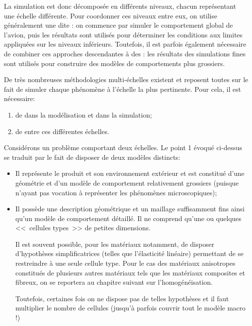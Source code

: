 La simulation est donc décomposée en différents niveaux, chacun représentant une échelle
différente. Pour coordonner ces niveaux entre eux, on utilise généralement une
 dite :
on commence par simuler  le comportement global de l'avion, puis les résultats sont utilisés pour
déterminer les conditions aux limites appliquées sur les niveaux inférieurs.
Toutefois, il est parfois également nécessaire de combiner ces approches descendantes
à des :
les résultats des simulations fines sont utilisés pour construire des modèles de comportements
plus grossiers.

\medskip
De très nombreuses méthodologies multi-échelles existent et reposent
toutes sur le fait de simuler chaque phénomène à l'échelle la plus
pertinente.
Pour cela, il est nécessaire:
\begin{enumerate}
   \item de  dans la modélisation et dans la simulation;
   \item de  entre ces différentes échelles.
\end{enumerate}

\medskip
Considérons un problème comportant deux échelles.
Le point 1 évoqué ci-dessus se traduit par le fait de disposer de deux modèles
distincts:
\begin{itemize}
   \item {}

	Il représente le produit et son environnement extérieur et est constitué
	d'une géométrie et d'un modèle de comportement relativement grossiers
	(puisque n'ayant pas vocation à représenter les phénomènes microscopiques);
   \item {}

	Il possède une description géométrique et un maillage suffisamment fins ainsi qu'un
	modèle de comportement détaillé. Il ne comprend qu'une ou quelques
	<<~cellules types~>> de petites dimensions.

	Il est souvent possible, pour les matériaux notamment, de disposer d'hypothèses
	simplificatrices (telles que l'élasticité linéaire) permettant de se restreindre à une
	seule cellule type.
	Pour le cas des matériaux anisotropes constitués de plusieurs autres matériaux tels
	que les matériaux composites et fibreux, on se reportera au chapitre suivant sur l'homogénéisation.

	Toutefois, certaines fois on ne dispose pas de telles hypothèses et il faut multiplier le nombre
	de cellules (jusqu'à parfois couvrir tout le modèle macro !)
\end{itemize}

